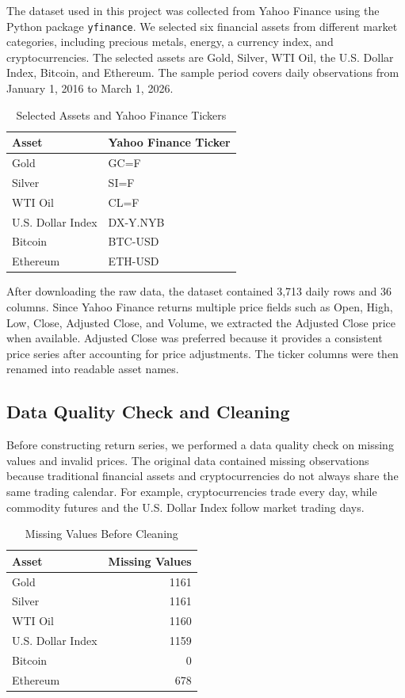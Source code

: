 \documentclass[12pt]{article}
\begin{document}
The dataset used in this project was collected from Yahoo Finance using the Python package \texttt{yfinance}. We selected six financial assets from different market categories, including precious metals, energy, a currency index, and cryptocurrencies. The selected assets are Gold, Silver, WTI Oil, the U.S. Dollar Index, Bitcoin, and Ethereum. The sample period covers daily observations from January 1, 2016 to March 1, 2026.

\begin{table}[H]
\centering
\caption{Selected Assets and Yahoo Finance Tickers}
\begin{tabular}{ll}
\toprule
\textbf{Asset} & \textbf{Yahoo Finance Ticker} \\
\midrule
Gold & GC=F \\
Silver & SI=F \\
WTI Oil & CL=F \\
U.S. Dollar Index & DX-Y.NYB \\
Bitcoin & BTC-USD \\
Ethereum & ETH-USD \\
\bottomrule
\end{tabular}
\end{table}

After downloading the raw data, the dataset contained 3,713 daily rows and 36 columns. Since Yahoo Finance returns multiple price fields such as Open, High, Low, Close, Adjusted Close, and Volume, we extracted the Adjusted Close price when available. Adjusted Close was preferred because it provides a consistent price series after accounting for price adjustments. The ticker columns were then renamed into readable asset names.

\subsection{Data Quality Check and Cleaning}

Before constructing return series, we performed a data quality check on missing values and invalid prices. The original data contained missing observations because traditional financial assets and cryptocurrencies do not always share the same trading calendar. For example, cryptocurrencies trade every day, while commodity futures and the U.S. Dollar Index follow market trading days.

\begin{table}[H]
\centering
\caption{Missing Values Before Cleaning}
\begin{tabular}{lr}
\toprule
\textbf{Asset} & \textbf{Missing Values} \\
\midrule
Gold & 1161 \\
Silver & 1161 \\
WTI Oil & 1160 \\
U.S. Dollar Index & 1159 \\
Bitcoin & 0 \\
Ethereum & 678 \\
\bottomrule
\end{tabular}
\end{table}
\end{document}
